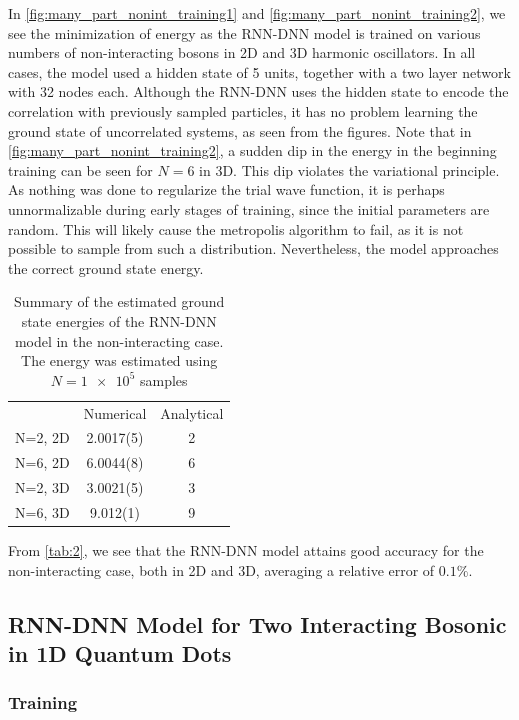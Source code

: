 In \autoref{fig:many_part_nonint_training1} and
\autoref{fig:many_part_nonint_training2}, we see the minimization of energy as
the RNN-DNN model is trained on various numbers of non-interacting bosons in 2D
and 3D harmonic oscillators. In all cases, the model used a hidden state of 5
units, together with a two layer network with 32 nodes each. Although the
RNN-DNN uses the hidden state to encode the correlation with previously sampled
particles, it has no problem learning the ground state of uncorrelated systems,
as seen from the figures. Note that in
\autoref{fig:many_part_nonint_training2}, a sudden dip in the energy in the
beginning training can be seen for $N=6$ in 3D. This dip violates the
variational principle. As nothing was done to regularize the trial wave
function, it is perhaps unnormalizable during early stages of training, since
the initial parameters are random. This will likely cause the metropolis
algorithm to fail, as it is not possible to sample from such a distribution.
Nevertheless, the model approaches the correct ground state energy. 

\begin{table}[ht]
	\begin{tabular}{l|SS}
		\toprule
		& {Numerical}& {Analytical}     \\
		N=2, 2D    & 2.0017(5) &  2 \\
		N=6, 2D    & 6.0044(8) &  6 \\
		N=2, 3D    & 3.0021(5) &  3 \\
		N=6, 3D    & 9.012(1)  &  9 \\
		\bottomrule
	\end{tabular}
	\caption{Summary of the estimated ground state energies of the RNN-DNN model
      in the non-interacting case. The energy was estimated using $N=\num{1e5}$
      samples} 
	\label{tab:2}
\end{table}

From \autoref{tab:2}, we see that the RNN-DNN model attains good accuracy for the non-interacting case, both in 2D and 3D, averaging a relative error of $0.1\%$.

\subsection{RNN-DNN Model for Two Interacting Bosonic in 1D Quantum Dots}
\subsubsection{Training}


